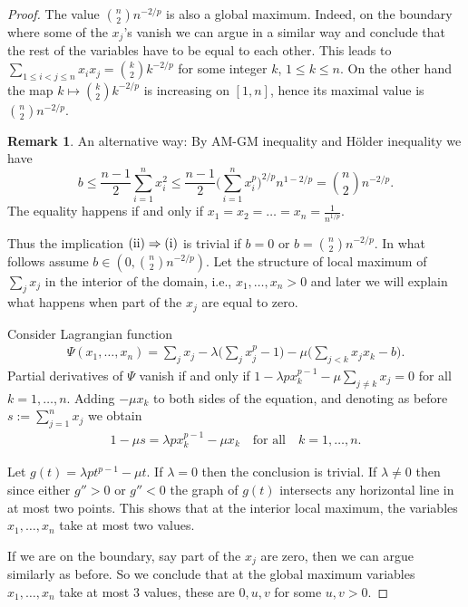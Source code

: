 \documentclass[11pt]{article}
\theoremstyle{definition}
\newtheorem{remark}[theorem]{Remark}
\newcommand{\1}{\mathbf{1}}
\begin{document}
\begin{proof}
      The value  $\binom{n}{2}n^{-2/p}$ is also a global maximum. Indeed, on the boundary where some of the $x_{j}$'s vanish we can argue in a similar way and conclude that the rest of the variables have to be equal to each other. This leads to $\sum_{1\leq i<j\leq n}x_{i}x_{j} = \binom{k}{2}k^{-2/p}$ for some integer $k$, $1\leq k \leq n$. On the other hand the map $k \mapsto \binom{k}{2}k^{-2/p}$ is increasing on $[1, n]$, hence its maximal value is $\binom{n}{2}n^{-2/p}$. 


\begin{remark}An alternative way: 
 By AM-GM inequality and H\"older inequality we have
      $$
b\leq \frac{n-1}{2}\sum_{i=1}^{n}x^2_i\leq \frac{n-1}{2}\Big(\sum_{i=1}^{n}x^p_i\Big)^{2/p}n^{1-2/p}=\binom{n}{2}n^{-2/p}.
      $$
      The equality happens if and only if $x_1=x_2=\dots=x_n=\frac{1}{n^{1/p}}$.
\end{remark}
      
      
      Thus the implication $\textup{(ii)} \Rightarrow \textup{(i)}$ is trivial if $b=0$ or $b=\binom{n}{2}n^{-2/p}$. In what follows assume $b\in (0, \binom{n}{2}n^{-2/p})$. Let the structure of local maximum of $\sum_{j} x_{j}$ in the interior of the domain, i.e., $x_{1}, \ldots, x_{n}>0$ and later we will explain what happens when part of the $x_{j}$ are equal to zero. 


 
      
      Consider Lagrangian function
      \begin{align*}
          \Psi(x_{1}, \ldots, x_{n}) = \sum_{j} x_{j} - \lambda \Big(\sum_{j} x_{j}^{p} -1\Big) - \mu \Big(\sum_{j<k} x_{j}x_{k} -b\Big).
      \end{align*}
      Partial derivatives of $\Psi$  vanish if and only if $1-\lambda p x_{k}^{p-1} - \mu \sum_{j\neq k} x_{j}=0$ for all $k=1, \ldots, n$. Adding $-\mu x_{k}$ to both sides of the equation,  and denoting  as before $s := \sum_{j=1}^{n}x_{j}$ we obtain 
      \begin{align*}
          1-\mu s = \lambda p x_{k}^{p-1} - \mu x_{k}\quad \text{for all} \quad k=1, \ldots, n. 
      \end{align*}

      Let $g(t) = \lambda p t^{p-1} - \mu t$. If $\lambda=0$ then the conclusion is trivial. If $\lambda \neq 0$ then since either $g''>0$ or $g''<0$ the graph of $g(t)$ intersects any horizontal line in at most two points. This shows that at the interior local maximum, the variables $x_{1}, \ldots, x_{n}$ take at most two values. 

      If we are on the boundary, say part of the $x_{j}$ are zero, then we can argue similarly as before. So we conclude that at the global maximum variables $x_{1}, \ldots, x_{n}$ take at most 3 values, these are $0,u,v$ for some $u,v>0$. 
    \end{proof}
\end{document}

